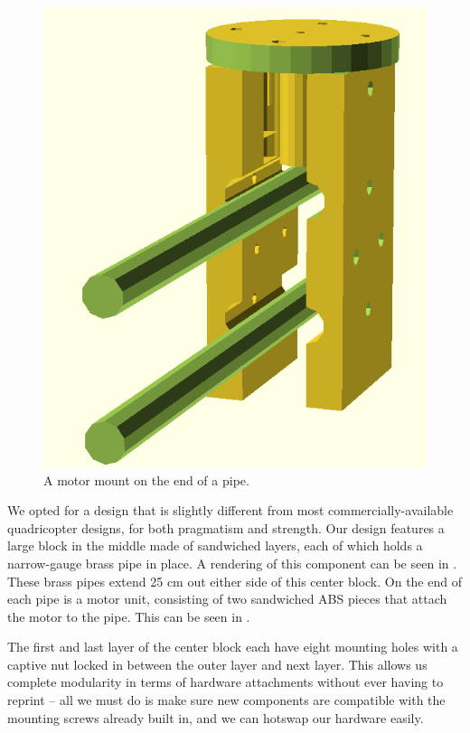 \begin{figure}[htb]
  \centering
  \includegraphics[scale=0.4]{figures/fred}
  \caption{A motor mount on the end of a pipe.}
  \label{fig:fred}
\end{figure}

We opted for a design that is slightly different from most
commercially-available quadricopter designs, for both pragmatism and
strength. Our design features a large block in the middle made
of sandwiched layers, each of which holds a narrow-gauge brass pipe in
place. A rendering of this component can be seen in
. These brass pipes extend 25 cm out either side of this
center block. On the end of each pipe is a motor unit, consisting of
two sandwiched ABS pieces that attach the motor to the pipe. This can
be seen in .

The first and last layer of the center block each have eight mounting
holes with a captive nut locked in between the outer layer and next
layer. This allows us complete modularity in terms of hardware
attachments without ever having to reprint -- all we must do is
make sure new components are compatible with the mounting screws already
built in, and we can hotswap our hardware easily.

